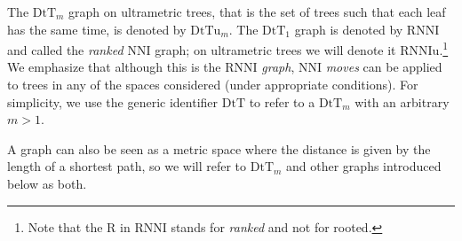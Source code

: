 \documentclass[11pt]{amsart}
\theoremstyle{definition}
\newcommand{\nni}{\mathrm{NNI}}
\newcommand{\rnni}{\mathrm{RNNI}}
\newcommand{\rnniu}{\mathrm{RNNIu}}
\newcommand{\dtt}{\mathrm{DtT}}
\newcommand{\dttu}{\mathrm{DtTu}}
\begin{document}
The $\dtt_m$ graph on ultrametric trees, that is the set of trees such that each leaf has the same time, is denoted by $\dttu_m$.
The $\dtt_1$ graph is denoted by $\rnni$ and called the \emph{ranked $\nni$} graph; on ultrametric trees we will denote it $\rnniu$.\footnote{
Note that the R in $\rnni$ stands for \emph{ranked} and not for rooted.}
We emphasize that although this is the $\rnni$ \emph{graph}, NNI \emph{moves} can be applied to trees in any of the spaces considered (under appropriate conditions).
For simplicity, we use the generic identifier $\dtt$ to refer to a $\dtt_m$ with an arbitrary $m > 1$.

A graph can also be seen as a metric space where the distance is given by the length of a shortest path, so we will refer to $\dtt_m$ and other graphs introduced below as both.
\end{document}
